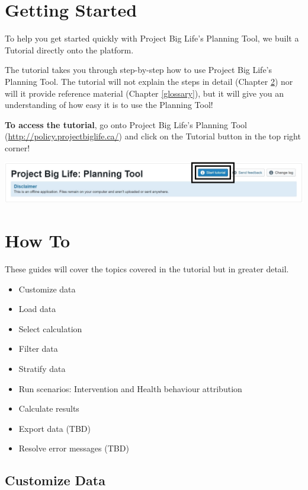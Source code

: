 \documentclass[]{book}
\providecommand{\tightlist}{%
  \setlength{\itemsep}{0pt}\setlength{\parskip}{0pt}}
\begin{document}
\chapter{Getting Started}\label{getting-started}

To help you get started quickly with Project Big Life's Planning Tool,
we built a Tutorial directly onto the platform.

The tutorial takes you through step-by-step how to use Project Big
Life's Planning Tool. The tutorial will not explain the steps in detail
(Chapter \ref{howto}) nor will it provide reference material (Chapter
\ref{glossary}), but it will give you an understanding of how easy it is
to use the Planning Tool!

\textbf{To access the tutorial}, go onto Project Big Life's Planning
Tool (\url{http://policy.projectbiglife.ca/}) and click on the Tutorial
button in the top right corner!

\begin{center}\includegraphics{Images/Tutorial Button} \end{center}

\chapter{How To}\label{howto}

These guides will cover the topics covered in the tutorial but in
greater detail.

\begin{itemize}
\tightlist
\item
  Customize data
\item
  Load data
\item
  Select calculation
\item
  Filter data
\item
  Stratify data
\item
  Run scenarios: Intervention and Health behaviour attribution
\item
  Calculate results
\item
  Export data (TBD)
\item
  Resolve error messages (TBD)
\end{itemize}

\section{Customize Data}\label{customize-data}
\end{document}
